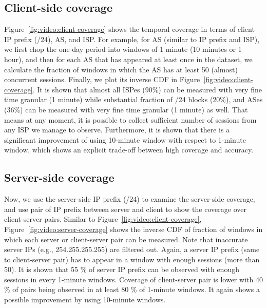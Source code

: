 
\subsection{Client-side coverage} 
Figure~\ref{fig:video:client-coverage} shows the temporal coverage in terms of client IP prefix (/24), AS, and ISP. For example, for AS (similar to IP prefix and ISP), we first chop the one-day period into windows of 1 minute (10 minutes or 1 hour), and then for each AS that has appeared at least once in the dataset, we calculate the fraction of windows in which the AS has at least 50 (almost) concurrent sessions. Finally, we plot its inverse CDF in Figure~\ref{fig:video:client-coverage}. 
It is shown that almost all ISPes (90\%) can be measured with very fine time granular (1 minute) while substantial fraction of /24 blocks (20\%), and ASes (36\%)  can be measured with very fine time granular (1 minute) as well. That means at any moment, it is possible to collect sufficient number of sessions from any ISP we manage to observe. Furthermore, it is shown that there is a significant improvement of using 10-minute window with respect to 1-minute window, which shows an explicit trade-off between high coverage and accuracy.


\subsection{Server-side coverage} 
Now, we use the server-side IP prefix (/24) to examine the server-side coverage, and use pair of IP prefix between server and client to show the coverage over client-server pairs. Similar to Figure~\ref{fig:video:client-coverage}, Figure~\ref{fig:video:server-coverage} shows the inverse CDF of fraction of windows in which each server or client-server pair can be measured. Note that inaccurate server IPs (e.g., 254.255.255.255) are filtered out. Again, a server IP prefix (same to client-server pair) has to appear in a window with enough sessions (more than 50).
It is shown that 55 \% of server IP prefix can be observed with enough sessions in every 1-minute windows. Coverage of client-server pair is lower with 40 \% of pairs being observed in at least 80 \% of 1-minute windows. It again shows a possible improvement by using 10-minute windows.


